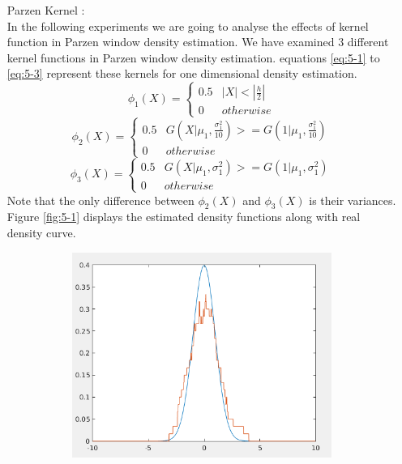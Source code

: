 \documentclass[12pt]{article}
\begin{document}
\begin{itemize}
\item[Parzen Kernel] :\\
In the following experiments we are going to analyse the effects of kernel function in Parzen window density estimation. We have examined 3 different kernel functions in Parzen window density estimation. equations \eqref{eq:5-1} to \eqref{eq:5-3} represent these kernels for one dimensional density estimation.
\begin{equation}
\phi_1(X) = \left\lbrace \begin{matrix}
0.5 & |X| < |\frac{h}{2}| \\
0 & otherwise
\end{matrix}\right.
\label{eq:5-1}
\end{equation}
\begin{equation}
\phi_2(X) = \left\lbrace \begin{matrix}
0.5 & G(X|\mu_1, \frac{\sigma_1^2}{10}) >= G(1|\mu_1, \frac{\sigma_1^2}{10}) \\
0 & otherwise
\end{matrix}\right.
\label{eq:5-2}
\end{equation}
\begin{equation}
\phi_3(X) = \left\lbrace \begin{matrix}
0.5 &  G(X|\mu_1, \sigma_1^2) >= G(1|\mu_1, \sigma_1^2) \\
0 & otherwise
\end{matrix}\right.
\label{eq:5-3}
\end{equation}
Note that the only difference between $\phi_2(X)$ and $\phi_3(X)$ is their variances. Figure \ref{fig:5-1} displays the estimated density functions along with real density curve.
\begin{figure}[h]
\centering
\begin{subfigure}{0.45\textwidth}
\centering 
\includegraphics[scale=0.4]{Imgs/5-1.png}

\end{subfigure}
\end{figure}
\end{itemize}
\end{document}
